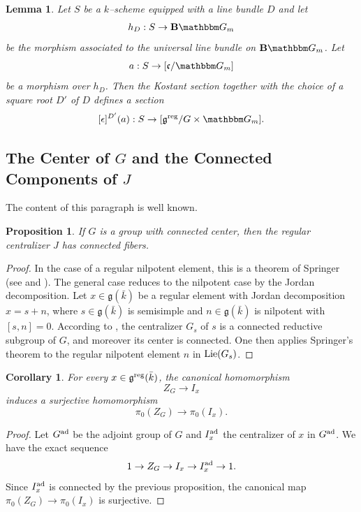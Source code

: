 \documentclass[12pt,english]{smfart}
\numberwithin{equation}{subsection}
\newtheorem{lemma}[equation]{Lemma}
\newtheorem{proposition}[equation]{Proposition}
\newtheorem{corollary}[equation]{Corollary}
\theoremstyle{remark}
\newcommand\GG{{\mathbbm G}}
\newcommand\Lie{{\rm Lie}}
\newcommand\ad{{\rm ad}}
\newcommand\reg{{\rm reg}}
\begin{document}
\begin{lemma}\label{epsilon D'}
Let $S$ be a $k$--scheme equipped with a line bundle $D$ and let 
$$h_D:S\to \mathbf{B}\GG_m$$ 
be the morphism associated to the universal line bundle on $\mathbf{B}\GG_m$. Let 
$$a:S\to [\mathfrak{c}/\GG_m]$$ 
be a morphism over $h_D$. Then the Kostant section together with the choice of a square root $D'$ of $D$ defines a section
$$[\epsilon]^{D'}(a):S\to [\mathfrak{g}^\reg/G\times\GG_m].$$
\end{lemma}

\subsection{The Center of $G$ and the Connected Components of $J$}
The content of this paragraph is well known.

\begin{proposition} \label{centre connexe}
If $G$ is a group with connected center, then the regular centralizer $J$ has connected fibers.
\end{proposition}

\begin{proof}
In the case of a regular nilpotent element, this is a theorem of Springer (see \cite[III, 3.7 and 1.14]{S-S} and \cite[Theorem 4.11]{S}). The general case reduces to the nilpotent case by the Jordan decomposition. Let $x\in \mathfrak{g}(\bar{k})$ be a regular element with Jordan decomposition $x=s+n$, where $s\in\mathfrak{g}(\bar{k})$ is semisimple and $n\in\mathfrak{g}(\bar{k})$ is nilpotent with $[s,n]=0$. According to \cite[3, Lemmas 5 and 8]{Kos}, %
the centralizer $G_s$ of $s$ is a connected reductive subgroup of $G$, and moreover its center is connected. One then applies Springer's theorem to the regular nilpotent element $n$ in $\Lie(G_s)$.
\end{proof}

\begin{corollary}\label{pi 0 ZG}
For every $x\in \mathfrak{g}^\reg(\bar{k})$, the canonical homomorphism
$$
Z_G\to I_x
$$
induces a surjective homomorphism
$$
\pi_0(Z_G)\to \pi_0(I_x).
$$
\end{corollary}

\begin{proof}
Let $G^\ad$ be the adjoint group of $G$ and $I^\ad_x$ the centralizer of $x$ in $G^\ad$. We have the exact sequence
$$
1\to Z_G\to I_x\to I^\ad_x\to 1.
$$
Since $I^\ad_x$ is connected by the previous proposition, the canonical map $\pi_0(Z_G)\to \pi_0(I_x)$ is surjective.
\end{proof}
\end{document}

